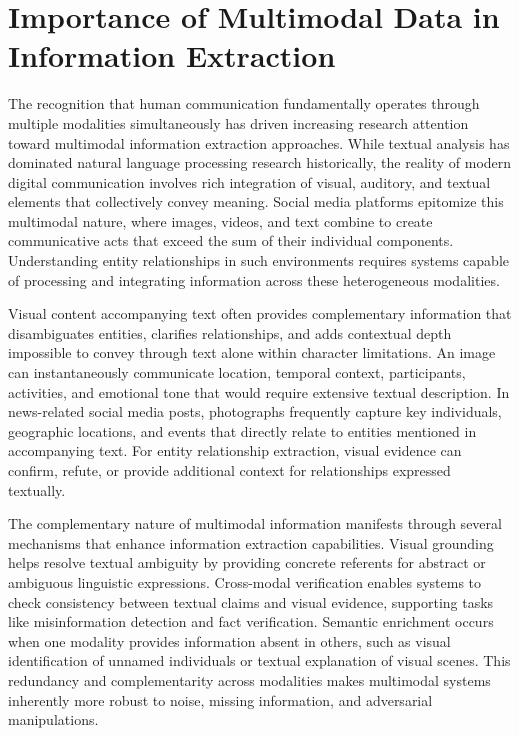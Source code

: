 \documentclass[12pt,a4paper]{report}
\begin{document}
\section{Importance of Multimodal Data in Information Extraction}

The recognition that human communication fundamentally operates through multiple modalities simultaneously has driven increasing research attention toward multimodal information extraction approaches. While textual analysis has dominated natural language processing research historically, the reality of modern digital communication involves rich integration of visual, auditory, and textual elements that collectively convey meaning. Social media platforms epitomize this multimodal nature, where images, videos, and text combine to create communicative acts that exceed the sum of their individual components. Understanding entity relationships in such environments requires systems capable of processing and integrating information across these heterogeneous modalities.

Visual content accompanying text often provides complementary information that disambiguates entities, clarifies relationships, and adds contextual depth impossible to convey through text alone within character limitations. An image can instantaneously communicate location, temporal context, participants, activities, and emotional tone that would require extensive textual description. In news-related social media posts, photographs frequently capture key individuals, geographic locations, and events that directly relate to entities mentioned in accompanying text. For entity relationship extraction, visual evidence can confirm, refute, or provide additional context for relationships expressed textually.

The complementary nature of multimodal information manifests through several mechanisms that enhance information extraction capabilities. Visual grounding helps resolve textual ambiguity by providing concrete referents for abstract or ambiguous linguistic expressions. Cross-modal verification enables systems to check consistency between textual claims and visual evidence, supporting tasks like misinformation detection and fact verification. Semantic enrichment occurs when one modality provides information absent in others, such as visual identification of unnamed individuals or textual explanation of visual scenes. This redundancy and complementarity across modalities makes multimodal systems inherently more robust to noise, missing information, and adversarial manipulations.
\end{document}
